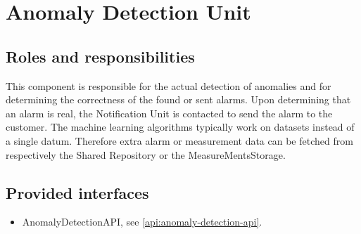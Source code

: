 \section{Anomaly Detection Unit}
\label{element:anomaly-detection-unit}

\subsection{Roles and responsibilities}

\npar This component is responsible for the actual detection of anomalies and
for determining the correctness of the found or sent alarms. Upon determining
that an alarm is real, the Notification Unit is contacted to send the alarm to
the customer. The machine learning algorithms typically work on datasets instead
of a single datum. Therefore extra alarm or measurement data can be fetched from
respectively the Shared Repository or the MeasureMentsStorage.

\subsection{Provided interfaces}

\begin{itemize}
  \item AnomalyDetectionAPI, see \ref{api:anomaly-detection-api}.
\end{itemize}



